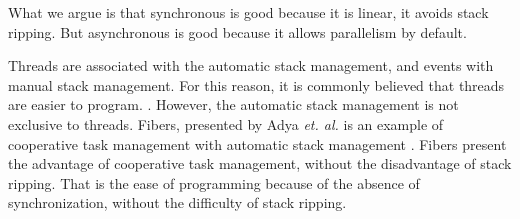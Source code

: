 
















What we argue is that synchronous is good because it is linear, it avoids stack ripping.
But asynchronous is good because it allows parallelism by default.




Threads are associated with the automatic stack management, and events with manual stack management.
For this reason, it is commonly believed that threads are easier to program.
\cite{Thread systems allow programmers to express control flow and encapsulate state in a more natural manner} \cite{Behren2003}.
However, the automatic stack management is not exclusive to threads.
Fibers, presented by Adya \textit{et. al.} is an example of cooperative task management with automatic stack management \cite{Adya2002} .
Fibers present the advantage of cooperative task management, without the disadvantage of stack ripping.
That is the ease of programming because of the absence of synchronization, without the difficulty of stack ripping.

